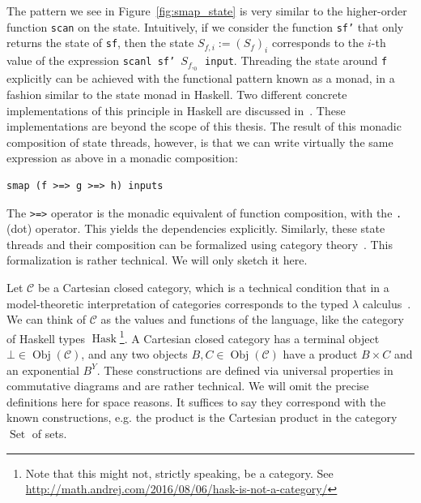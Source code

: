 The pattern we see in Figure~\ref{fig:smap_state} is very similar to the higher-order function \texttt{scan} on the state.
Intuitively, if we consider the function \texttt{sf'} that only returns the state of \texttt{sf}, then the state $S_{f,i} := (S_f)_i$ corresponds to the $i$-th value of the expression \texttt{scanl sf' $S_{f,_0}$ input}.
Threading the state around \texttt{f} explicitly can be achieved with the functional pattern known as a monad, in a fashion similar to the state monad in Haskell. 
Two different concrete implementations of this principle in Haskell are discussed in~\cite{ertel_haskell19}. These implementations are beyond the scope of this thesis.
The result of this monadic composition of state threads, however, is that we can write virtually the same expression as above in a monadic composition:

\begin{verbatim}
smap (f >=> g >=> h) inputs
\end{verbatim}

The \texttt{>=>} operator is the monadic equivalent of function composition, with the \texttt{.} (dot) operator. This yields the dependencies explicitly.
Similarly, these state threads and their composition can be formalized using category theory~\cite{ertel_haskellsup19}.
This formalization is rather technical. We will only sketch it here.

Let $\mathcal{C}$ be a Cartesian closed category, which is a technical condition that in a model-theoretic interpretation of categories corresponds to the typed $\lambda$ calculus~\cite{huet1985cartesian}.
We can think of $\mathcal{C}$ as the values and functions of the language, like the category of Haskell types $\operatorname{Hask}$\footnote{Note that this might not, strictly speaking, be a category. See \url{http://math.andrej.com/2016/08/06/hask-is-not-a-category/}}.
A Cartesian closed category has a terminal object $\bot \in \operatorname{Obj}(\mathcal{C})$, and any two objects $B,C \in \operatorname{Obj}(\mathcal{C})$ have a product $B \times C$ and an exponential $B^Y$.
These constructions are defined via universal properties in commutative diagrams and are rather technical.
We will omit the precise definitions here for space reasons.
It suffices to say they correspond with the known constructions, e.g. the product is the Cartesian product in the category $\operatorname{Set}$ of sets. 

